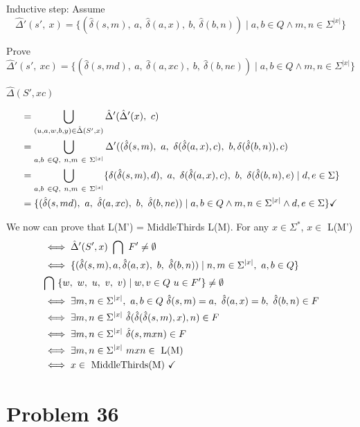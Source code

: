 \documentclass[11pt]{article}
\begin{document}
Inductive step: Assume
	\[\hat{\Delta}'(s',\ x) = \{ (\hat{\delta}(s,m),\ a,\ \hat{\delta}(a,x),\ b,\ \hat{\delta}(b,n)) \mid a,b \in Q \wedge m,n \in \Sigma^{|x|}\} \]
	
Prove
	\[\hat{\Delta}'(s',\ xc) = \{ (\hat{\delta}(s,md),\ a,\ \hat{\delta}(a,xc),\ b,\ \hat{\delta}(b,ne)) \mid a,b \in Q \wedge m,n \in \Sigma^{|x|}\} \]
	
$\hat{\Delta}(S', xc)$

\begin{align*}
&= \bigcup _{(u,a,w,b,y) \in \hat{\Delta}(S', x)} \hat{\Delta}'(\hat{\Delta}'(x),\ c)
\\
&= \bigcup _{a,b\ \in Q,\ n,m\ \in\ \Sigma^{|x|}} \Delta'((\hat{\delta}(s,m),\ a,\ \delta(\hat{\delta}(a, x),c),\ b, \delta(\hat{\delta}(b,n)), c) 
\\
&= \bigcup _{a,b\ \in Q,\ n,m\ \in\ \Sigma^{|x|}} \{ \delta(\hat{\delta}(s,m),d),\ a,\ \delta(\hat{\delta}(a, x), c),\ b,\ \delta(\hat{\delta}(b,n),e) \mid d,e \in \Sigma \}
\\
&= \{ ( \hat{\delta}(s, md),\ a,\ \hat{\delta}(a, xc),\ b,\ \hat{\delta}(b, ne)) \mid a,b \in Q \wedge m,n \in \Sigma^{|x|} \wedge d,e \in \Sigma \} \text{\checkmark}
\end{align*}

We now can prove that L(M') = MiddleThirds L(M). For any $x \in \Sigma^*$, $x\in $ L(M')
\begin{align*}
&\iff \hat{\Delta}'(S', x)\ \bigcap \ F' \neq \emptyset
\\
&\iff \{( \hat{\delta}(s,m), a, \hat{\delta}(a, x),\ b,\ \hat{\delta}(b,n) ) \mid n,m \in \Sigma^{|x|},\ a,b \in Q \}
\\
&\bigcap\ \{w,\ w,\ u,\ v,\ v) \mid w,v \in Q\ u \in F' \} \neq \emptyset
\\
&\iff \exists m,n \in \Sigma^{|x|},\ a,b \in Q\ \hat{\delta}(s,m) = a,\ \hat{\delta}(a, x) = b,\ \hat{\delta}(b, n) \in F
\\
&\iff \exists m,n \in \Sigma^{|x|}\ \hat{\delta}(\hat{\delta}(\hat{\delta}(s, m), x), n) \in F
\\
& \iff \exists m,n \in \Sigma^{|x|}\ \hat{\delta}(s, mxn) \in F
\\
& \iff \exists m,n \in \Sigma^{|x|}\ mxn \in \text{ L(M)}
\\
&\iff x \in \text{ MiddleThirds(M) \checkmark}
\end{align*}

\section*{Problem 36}
\end{document}
